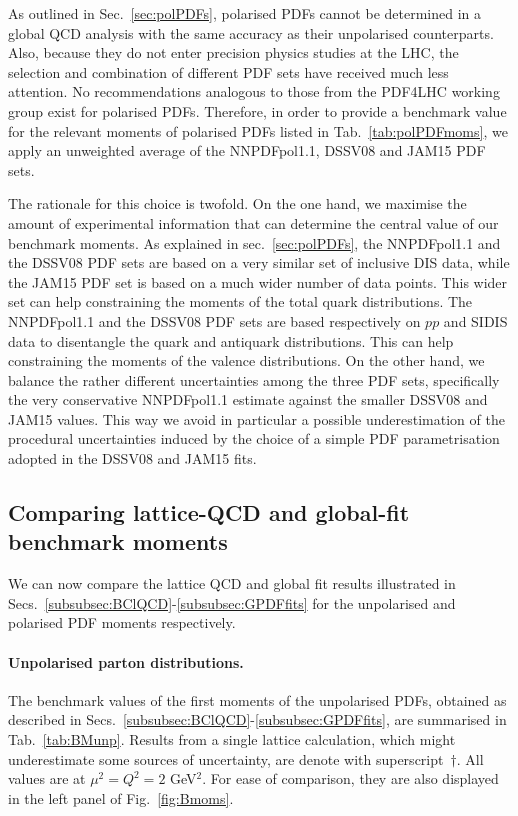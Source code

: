 As outlined in Sec.~\ref{sec:polPDFs}, polarised PDFs cannot be determined in a 
global QCD analysis with the same accuracy as their unpolarised counterparts.
%
Also, because they do not enter precision physics studies at the LHC, the
selection and combination of different PDF sets have received much less
attention.
%
No recommendations analogous to those from the PDF4LHC working group
exist for polarised PDFs.
%
Therefore, in order to provide a benchmark value for the relevant moments of 
polarised PDFs listed in Tab.~\ref{tab:polPDFmoms}, we apply an unweighted 
average of the NNPDFpol1.1, DSSV08 and JAM15 PDF sets.

The rationale for this choice is twofold.
%
On the one hand, we maximise the amount of experimental information 
that can determine the central value of our benchmark moments.
%
As explained in sec.~\ref{sec:polPDFs}, the NNPDFpol1.1 and the DSSV08 PDF 
sets are based on a very similar set of inclusive DIS data, while the JAM15 
PDF set is based on a much wider number of data points.
%
This wider set can help constraining the moments of the total quark 
distributions.
%
The NNPDFpol1.1 and the DSSV08 PDF sets are based respectively on $pp$ and 
SIDIS data to disentangle the quark and antiquark distributions.
%
This can help constraining the moments of the valence distributions.
%
On the other hand, we balance the rather different uncertainties among the 
three PDF sets, specifically the very conservative NNPDFpol1.1 estimate
against the smaller DSSV08 and JAM15 values.
%
This way we avoid in particular a possible underestimation of the procedural
uncertainties induced by the choice of a simple PDF parametrisation 
adopted in the DSSV08 and JAM15 fits.

\subsection{Comparing lattice-QCD and global-fit benchmark moments}
\label{subsec:BN}

We can now compare the lattice QCD and global fit results illustrated in 
Secs.~\ref{subsubsec:BClQCD}-\ref{subsubsec:GPDFfits} for the unpolarised
and polarised PDF moments respectively.

\paragraph{Unpolarised parton distributions.}
%
The benchmark values of the first moments of the unpolarised PDFs, obtained
as described in Secs.~\ref{subsubsec:BClQCD}-\ref{subsubsec:GPDFfits}, 
are summarised in Tab.~\ref{tab:BMunp}.
%
Results from a single lattice calculation, which might underestimate some 
sources of uncertainty, are denote with superscript~$\dagger$.
%
All values are at $\mu^2=Q^2=2$ GeV$^2$.
%
For ease of comparison, they are also displayed in 
the left panel of Fig.~\ref{fig:Bmoms}.


